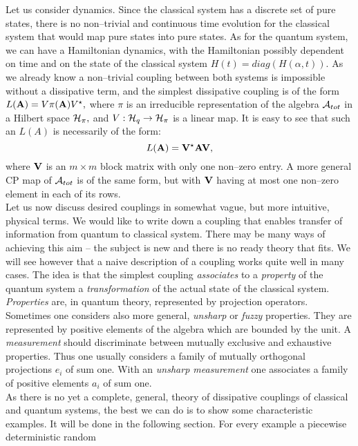 \documentclass[12pt]{article}
\begin{document}
Let us consider dynamics.  Since the classical system has a discrete
set of pure states,  there is no non--trivial and continuous  time
evolution for the
classical system that would map pure states into pure states. 
 As for the quantum system,  we can have a Hamiltonian dynamics,  with
the Hamiltonian possibly dependent on time and on the state of the 
classical
system $H (t) = diag (H (\alpha, t)) . $ As we already know a non--trivial
coupling between both systems is impossible without a dissipative
term,  and the simplest dissipative coupling is of the form
$L ({\bf A})=V\pi ({\bf A})V^\star , $ where $\pi$ is an irreducible
representation of the algebra ${\cal A}_{tot}$ in a Hilbert space
${\cal H}_\pi , $ and $V: {\cal H}_q\rightarrow{\cal H}_\pi$ is a linear
map.  It is easy to see that such an $L (A)$ is necessarily of the form: 
$$L ({\bf A})={\bf V}^\star {\bf A} {\bf V} , $$
where ${\bf V}$ is an $m\times m$ block matrix with only one non--zero
entry.  A more general CP map of ${\cal A}_{tot}$ is of the same form, 
but with ${\bf V}$ having at most one non--zero element in each of its
rows. \\
Let us now discuss   desired couplings in somewhat vague,  but more
intuitive,  physical terms.  We would like to write down a coupling that
enables transfer of information from quantum to classical system. 
There may be many ways of achieving this aim -- the subject is new and
there is no ready theory that fits.
We will see however that a naive
description of a coupling works quite well in many cases.  The idea is 
that the simplest coupling {\sl associates} to a {\sl property} of the
quantum system a {\sl transformation} of the actual state of the
classical system.  \\
{\sl Properties} are,  in quantum theory,  represented by projection
operators.  Sometimes one considers also more general,  {\sl unsharp} or
{\sl fuzzy } properties.  They are represented by positive elements of
the algebra which are bounded by the unit.  A {\sl measurement} should
discriminate between mutually exclusive and exhaustive properties. 
Thus one usually considers a family of mutually orthogonal projections
$e_i$ of sum one.  With an {\sl unsharp measurement} one associates 
a family
of positive elements $a_i$ of sum one. \\ 
As there is no yet a complete,  general,  theory
of dissipative couplings of classical and quantum systems,  the best we
can do is to show some characteristic examples. It will be done in the
following section.  For every example a piecewise deterministic random
\end{document}
